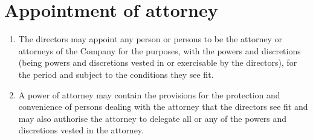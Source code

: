 \section{Appointment of attorney}

\begin{enumerate}[label=(\alph*)]
    \item The directors may appoint any person or persons to be the attorney or attorneys of the Company for the purposes, with the powers and discretions (being powers and discretions vested in or exercisable by the directors), for the period and subject to the conditions they see fit.
    
    \item A power of attorney may contain the provisions for the protection and convenience of persons dealing with the attorney that the directors see fit and may also authorise the attorney to delegate all or any of the powers and discretions vested in the attorney.
\end{enumerate} 